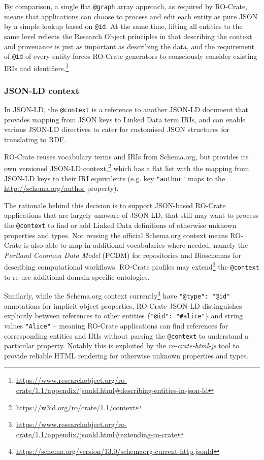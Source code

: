 \documentclass[ds,v1.1.2,openaccess]{iosart2x}%
\begin{document}
By comparison, a single flat \texttt{@graph} array approach, as required by
RO-Crate, means that applications can choose to process and edit each
entity as pure JSON by a simple lookup based on \texttt{@id}. At the same
time, lifting all entities to the same level reflects the Research
Object principles \cite{doi:10.1016/j.future.2011.08.004} in that
describing the context and provenance is just as important as
describing the data, and the requirement of \texttt{@id} of every entity
forces RO-Crate generators to consciously consider existing IRIs and
identifiers.\footnote{\url{https://www.researchobject.org/ro-crate/1.1/appendix/jsonld.html\#describing-entities-in-json-ld}}

\subsubsection{JSON-LD context}

In JSON-LD, the \texttt{@context} is a reference to another JSON-LD document
that provides mapping from JSON keys to Linked Data term IRIs, and can
enable various JSON-LD directives to cater for customised JSON
structures for translating to RDF.

RO-Crate reuses vocabulary terms and IRIs from Schema.org, but provides
its own versioned JSON-LD
context,\footnote{\url{https://w3id.org/ro/crate/1.1/context}} which has a flat list
with the mapping from JSON-LD keys to their IRI equivalents (e.g. key
\texttt{"author"} maps to the \url{http://schema.org/author} property).

The rationale behind this decision is to support JSON-based RO-Crate
applications that are largely unaware of JSON-LD, that still may want
to process the \texttt{@context} to find or add Linked Data definitions of
otherwise unknown properties and types. Not reusing the official
Schema.org context means RO-Crate is also able to map in additional
vocabularies where needed, namely the \textit{Portland Common Data Model}
(PCDM) \cite{pcdm} for repositories and Bioschemas \cite{bioschemas_2017} for
describing computational workflows. RO-Crate profiles may
extend\footnote{\url{https://www.researchobject.org/ro-crate/1.1/appendix/jsonld.html\#extending-ro-crate}}
the \texttt{@context} to re-use additional domain-specific ontologies.

Similarly, while the Schema.org context
currently\footnote{\url{https://schema.org/version/13.0/schemaorg-current-http.jsonld}}
have \texttt{"@type": "@id"} annotations for implicit object properties, RO-Crate
JSON-LD distinguishes explicitly between references to other entities
\texttt{\{"@id": "\#alice"}\}
and string values \texttt{"Alice"} -- meaning
RO-Crate applications can find references for corresponding entities
and IRIs without parsing the \texttt{@context} to understand a particular
property. Notably this is exploited by the \textit{ro-crate-html-js}
\cite{ro-crate-html-js} tool to provide reliable HTML rendering for
otherwise unknown properties and types.
\end{document}
